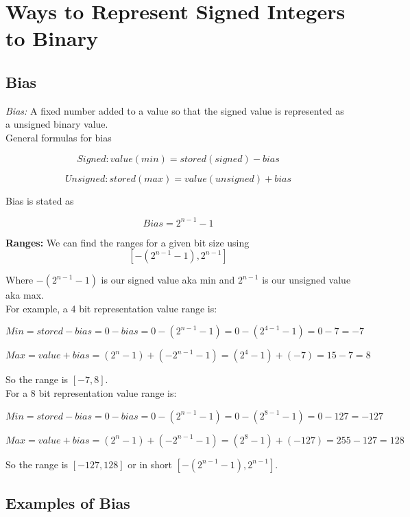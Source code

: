 \documentclass{article}
\begin{document}
\section{Ways to Represent Signed Integers to Binary}
\subsection*{Bias}
\textit{Bias:} A fixed number added to a value so that the signed value is represented as a unsigned binary value. \\

\noindent General formulas for bias

\[
Signed: value(min) = stored(signed) - bias
\]

\[
Unsigned: stored(max) = value(unsigned)  + bias
\]

\noindent Bias is stated as 

\[
Bias = 2^{n-1} - 1
\]

\noindent \textbf{Ranges:} We can find the ranges for a given bit size using  \\

\[
[-(2^{n-1} - 1), 2^{n-1}] 
\]

\noindent Where $-(2^{n-1} - 1)$ is our signed value aka min and $2^{n-1}$ is our unsigned value aka max. \\
	

\noindent For example, a 4 bit representation value range is:

\[
Min = stored - bias = 0 - bias = 0 - (2^{n-1} - 1) = 0 - (2^{4-1} - 1) = 0 - 7 = -7
\]

\[
Max = value + bias = (2^{n} - 1) + (-2^{n-1} - 1) = (2^{4} - 1) + (-7) = 15 - 7 = 8
\]

\noindent So the range is $[-7,8]$. \\

\noindent For a 8 bit representation value range is:

\[
Min = stored - bias = 0 - bias = 0 - (2^{n-1} - 1) = 0 - (2^{8-1} - 1) = 0 - 127 = -127
\]

\[
Max = value + bias = (2^{n} - 1) + (-2^{n-1} - 1) = (2^{8} - 1) + (-127) = 255 - 127 = 128
\]

\noindent So the range is $[-127,128]$ or in short $[-(2^{n-1} - 1), 2^{n-1}]$. \\

\subsection*{Examples of Bias}
\end{document}
